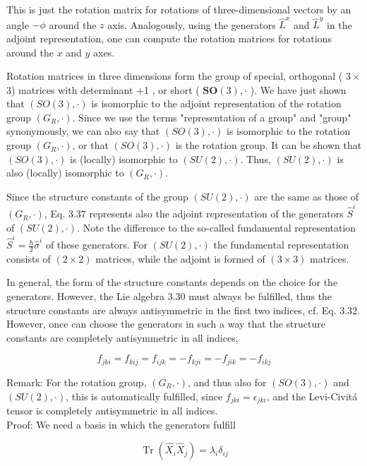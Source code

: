 \documentclass[10pt, letterpaper]{article}
\begin{document}
This is just the rotation matrix for rotations of three-dimensional vectors by an angle $-\phi$ around the $z$ axis. Analogously, using the generators $\hat{L}^{x}$ and $\hat{L}^{y}$ in the adjoint representation, one can compute the rotation matrices for rotations around the $x$ and $y$ axes.

Rotation matrices in three dimensions form the group of special, orthogonal ( $3 \times$ 3) matrices with determinant +1 , or short ( $\boldsymbol{S O}(3), \cdot$ ). We have just shown that $(S O(3), \cdot)$ is isomorphic to the adjoint representation of the rotation group $\left(G_{R}, \cdot\right)$. Since we use the terms "representation of a group" and "group" synonymously, we can also say that $(S O(3), \cdot)$ is isomorphic to the rotation group $\left(G_{R}, \cdot\right)$, or that $(S O(3), \cdot)$ is the rotation group. It can be shown that $(S O(3), \cdot)$ is (locally) isomorphic to $(S U(2), \cdot)$. Thus, $(S U(2), \cdot)$ is also (locally) isomorphic to $\left(G_{R}, \cdot\right)$.

Since the structure constants of the group $(S U(2), \cdot)$ are the same as those of $\left(G_{R}, \cdot\right)$, Eq. 3.37 represents also the adjoint representation of the generators $\hat{S}^{i}$ of $(S U(2), \cdot)$. Note the difference to the so-called fundamental representation $\hat{S}^{i}=\frac{\hbar}{2} \hat{\sigma}^{i}$ of these generators. For $(S U(2), \cdot)$ the fundamental representation consists of $(2 \times 2)$ matrices, while the adjoint is formed of $(3 \times 3)$ matrices.

In general, the form of the structure constants depends on the choice for the generators. However, the Lie algebra 3.30 must always be fulfilled, thus the structure constants are always antisymmetric in the first two indices, cf. Eq. 3.32. However, once can choose the generators in such a way that the structure constants are completely antisymmetric in all indices,

$$
f_{j k i}=f_{k i j}=f_{i j k}=-f_{k j i}=-f_{j i k}=-f_{i k j}
$$

Remark: For the rotation group, $\left(G_{R}, \cdot\right)$, and thus also for $(S O(3), \cdot)$ and $(S U(2), \cdot)$, this is automatically fulfilled, since $f_{j k i}=\epsilon_{j k i}$, and the Levi-Civitá tensor is completely antisymmetric in all indices.\\
Proof: We need a basis in which the generators fulfill

$$
\operatorname{Tr}\left(\hat{X}_{i} \hat{X}_{j}\right)=\lambda_{i} \delta_{i j}
$$
\end{document}
